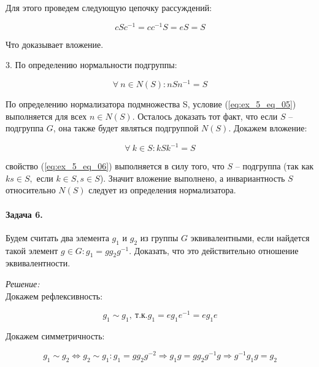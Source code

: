 \documentclass[10pt,a4paper]{article}
\begin{document}
	Для этого проведем следующую цепочку рассуждений:
	
	\begin{equation}
		\label{eq:ex_5_eq_04}
		cSc^{-1} = cc^{-1}S = eS = S
	\end{equation}
	
	Что доказывает вложение.
	
	3. По определению нормальности подгруппы:
	
	\begin{equation}
		\label{eq:ex_5_eq_05}
		\forall \ n \in N\left(S\right): nSn^{-1} = S
	\end{equation}
	
	По определению нормализатора подмножества S, условие (\ref{eq:ex_5_eq_05})
	выполняется для всех $n \in N\left(S\right)$. Осталось доказать тот факт, 
	что если $S$ -- подгруппа $G$, она также будет являться подгруппой 
	$N\left(S\right)$. Докажем вложение:
	
	\begin{equation}
		\label{eq:ex_5_eq_06}
		\forall \ k \in S: kSk^{-1} = S
	\end{equation}
	
	свойство (\ref{eq:ex_5_eq_06}) выполняется в силу того, что $S$ -- 
	подгруппа (так как $ks \in S,$ если $k \in S, s\in S$). Значит вложение 
	выполнено, а инвариантность $S$ относительно $N\left(S\right)$ следует из 
	определения нормализатора.
	
	\paragraph{Задача 6.} Будем считать два элемента $g_{1}$ и $g_{2}$ из группы
	$G$ эквивалентными, если найдется такой элемент $g \in G: g_{1} = gg_{2}
	g^{-1}$. Доказать, что это действительно отношение эквивалентности.
	
	\textit{Решение:}\\
	
	Докажем рефлексивность:
	
	\begin{equation}
		\label{eq:ex_6_eq_01}
		g_{1} \sim g_{1}, \ \text{т.к.} g_{1} = eg_{1}e^{-1} = eg_{1}e
	\end{equation}
	
	Докажем симметричность:
	
	\begin{equation}
		\label{eq:ex_6_eq_02}
		g_{1} \sim g_{2} \Leftrightarrow g_{2}\sim g_{1}: g_{1} = gg_{2}g^{-2} 
		\Rightarrow g_{1}g = gg_{2}g^{-1}g \Rightarrow g^{-1}g_{1}g = g_{2}
	\end{equation}
	
\end{document}
